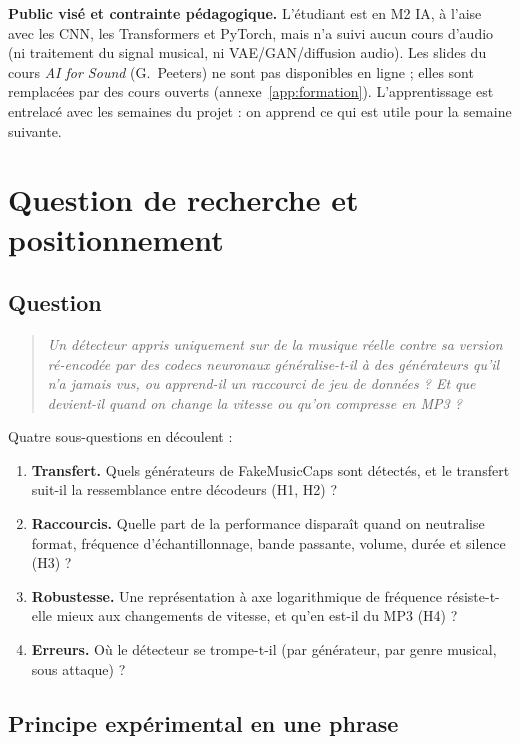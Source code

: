 \documentclass[11pt,a4paper]{article}
\begin{document}
\textbf{Public visé et contrainte pédagogique.} L'étudiant est en M2 IA, à l'aise avec les CNN, les Transformers et PyTorch, mais n'a suivi aucun cours d'audio (ni traitement du signal musical, ni VAE/GAN/diffusion audio). Les slides du cours \emph{AI for Sound} (G.~Peeters) ne sont pas disponibles en ligne ; elles sont remplacées par des cours ouverts (annexe~\ref{app:formation}). L'apprentissage est entrelacé avec les semaines du projet : on apprend ce qui est utile pour la semaine suivante.

\section{Question de recherche et positionnement}
\label{sec:question}

\subsection{Question}

\begin{quote}
\emph{Un détecteur appris uniquement sur de la musique réelle contre sa version ré-encodée par des codecs neuronaux généralise-t-il à des générateurs qu'il n'a jamais vus, ou apprend-il un raccourci de jeu de données ? Et que devient-il quand on change la vitesse ou qu'on compresse en MP3 ?}
\end{quote}

Quatre sous-questions en découlent :
\begin{enumerate}[label=\textbf{Q\arabic*.}]
  \item \textbf{Transfert.} Quels générateurs de FakeMusicCaps sont détectés, et le transfert suit-il la ressemblance entre décodeurs (H1, H2) ?
  \item \textbf{Raccourcis.} Quelle part de la performance disparaît quand on neutralise format, fréquence d'échantillonnage, bande passante, volume, durée et silence (H3) ?
  \item \textbf{Robustesse.} Une représentation à axe logarithmique de fréquence résiste-t-elle mieux aux changements de vitesse, et qu'en est-il du MP3 (H4) ?
  \item \textbf{Erreurs.} Où le détecteur se trompe-t-il (par générateur, par genre musical, sous attaque) ?
\end{enumerate}

\subsection{Principe expérimental en une phrase}
\end{document}
